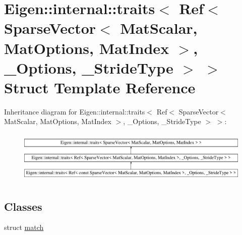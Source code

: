 \hypertarget{struct_eigen_1_1internal_1_1traits_3_01_ref_3_01_sparse_vector_3_01_mat_scalar_00_01_mat_optionsd46b48c0b126a924a96003bc7b99d5a2}{}\section{Eigen\+::internal\+::traits$<$ Ref$<$ Sparse\+Vector$<$ Mat\+Scalar, Mat\+Options, Mat\+Index $>$, \+\_\+\+Options, \+\_\+\+Stride\+Type $>$ $>$ Struct Template Reference}
\label{struct_eigen_1_1internal_1_1traits_3_01_ref_3_01_sparse_vector_3_01_mat_scalar_00_01_mat_optionsd46b48c0b126a924a96003bc7b99d5a2}
Inheritance diagram for Eigen\+::internal\+::traits$<$ Ref$<$ Sparse\+Vector$<$ Mat\+Scalar, Mat\+Options, Mat\+Index $>$, \+\_\+\+Options, \+\_\+\+Stride\+Type $>$ $>$\+:\begin{figure}[H]
\begin{center}
\leavevmode
\includegraphics[height=2.530120cm]{struct_eigen_1_1internal_1_1traits_3_01_ref_3_01_sparse_vector_3_01_mat_scalar_00_01_mat_optionsd46b48c0b126a924a96003bc7b99d5a2}
\end{center}
\end{figure}
\subsection*{Classes}
\begin{DoxyCompactItemize}
\item 
struct \mbox{\hyperlink{struct_eigen_1_1internal_1_1traits_3_01_ref_3_01_sparse_vector_3_01_mat_scalar_00_01_mat_options4b581d834744f71c5c7313d6641690e6}{match}}
\end{DoxyCompactItemize}
